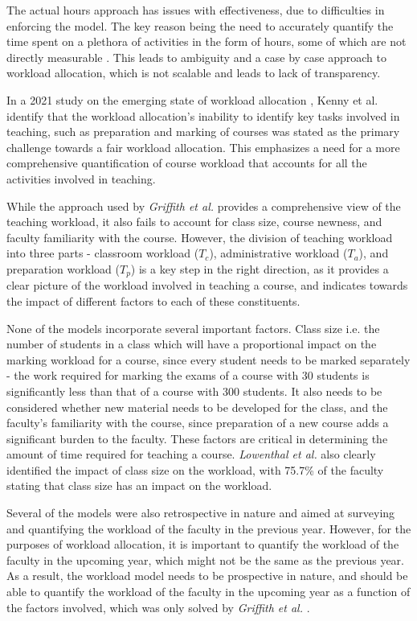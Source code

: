 The actual hours approach has issues with effectiveness, due to difficulties in enforcing the model. The key reason being the need to accurately quantify the time spent on a plethora of activities in the form of hours, some of which are not directly measurable \cite{kenny2014effectiveness}. This leads to ambiguity and a case by case approach to workload allocation, which is not scalable and leads to lack of transparency.

In a 2021 study on the emerging state of workload allocation \cite{kenny2021emerging}, Kenny et al. identify that the workload allocation's inability to identify key tasks involved in teaching, such as preparation and marking of courses was stated as the primary challenge towards a fair workload allocation.  This emphasizes a need for a more comprehensive quantification of course workload that accounts for all the activities involved in teaching.

While the approach used by \textit{Griffith et al.} provides a comprehensive view of the teaching workload, it also fails to account for class size, course newness, and faculty familiarity with the course. However, the division of teaching workload into three parts - classroom workload ($T_c$), administrative workload ($T_a$), and preparation workload ($T_p$) is a key step in the right direction, as it provides a clear picture of the workload involved in teaching a course, and indicates towards the impact of different factors to each of these constituents.

None of the models incorporate several important factors. Class size i.e. the number of students in a class which will have a proportional impact on the marking workload for a course, since every student needs to be marked separately - the work required for marking the exams of a course with 30 students is significantly less than that of a course with 300 students. It also needs to be considered whether new material needs to be developed for the class, and the faculty's familiarity with the course, since preparation of a new course adds a significant burden to the faculty. These factors are critical in determining the amount of time required for teaching a course. \textit{Lowenthal et al.} \cite{lowenthal2019does} also clearly identified the impact of class size on the workload, with 75.7\% of the faculty stating that class size has an impact on the workload.

Several of the models were also retrospective in nature and aimed at surveying and quantifying the workload of the faculty in the previous year. However, for the purposes of workload allocation, it is important to quantify the workload of the faculty in the upcoming year, which might not be the same as the previous year. As a result, the workload model needs to be prospective in nature, and should be able to quantify the workload of the faculty in the upcoming year as a function of the factors involved, which was only solved by \textit{Griffith et al.} \cite{griffith2020framework}.


